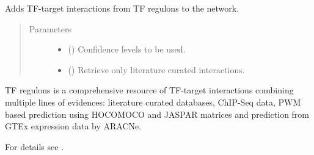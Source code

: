 \documentclass[letterpaper,10pt,english]{sphinxmanual}
\begin{document}
\begin{fulllineitems}
\begin{fulllineitems}
\label{\detokenize{main:pypath.main.PyPath.load_tfregulons}}
Adds TF-target interactions from TF regulons to the network.
\begin{quote}\begin{description}
\item[{Parameters}] \leavevmode\begin{itemize}
\item {} 
 () \textendash{} Confidence levels to be used.

\item {} 
 () \textendash{} Retrieve only literature curated interactions.

\end{itemize}

\end{description}\end{quote}

TF regulons is a comprehensive resource of TF-target interactions
combining multiple lines of evidences: literature curated databases,
ChIP-Seq data, PWM based prediction using HOCOMOCO and JASPAR matrices
and prediction from GTEx expression data by ARACNe.

For details see .

%
\begin{sphinxVerbatim}[commandchars=\\\{\}]
 
  
  
\end{sphinxVerbatim}

\end{fulllineitems}



\end{fulllineitems}
\end{document}
